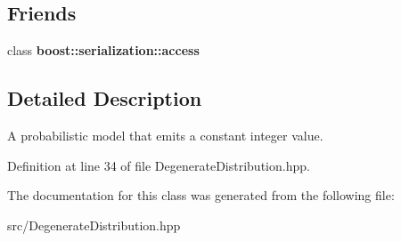 \subsection*{Friends}
\begin{DoxyCompactItemize}
\item 
\mbox{\label{classtops_1_1DegenerateDistribution_ac98d07dd8f7b70e16ccb9a01abf56b9c}} 
class {\bfseries boost\+::serialization\+::access}
\end{DoxyCompactItemize}


\subsection{Detailed Description}
A probabilistic model that emits a constant integer value. 

Definition at line 34 of file Degenerate\+Distribution.\+hpp.



The documentation for this class was generated from the following file\+:\begin{DoxyCompactItemize}
\item 
src/Degenerate\+Distribution.\+hpp\end{DoxyCompactItemize}
